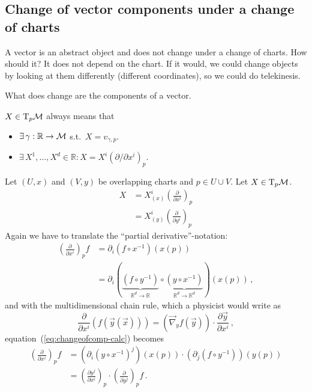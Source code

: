 \documentclass[11pt, a4paper, twocolumn]{article} %
\begin{document}
\subsection{Change of vector components under a change of charts}
\begin{note}
    A vector is an abstract object and does not change under a change of charts.
    How should it? It does not depend on the chart.
    If it would, we could change objects by looking at them differently (different coordinates),
    so we could do telekinesis.

    What does change are the components of a vector.
\end{note}
\begin{terminology}
    $X\in \T_p\M$ always means that 
    \begin{itemize}
        \item $\exists\,\gamma:\mathbb{R}\to\mathcal{M}$ s.t.\ $X = v_{\gamma,p}$.
        \item $\exists\, X^1,\ldots,X^d \in \mathbb{R}: X = X^i\left( \partial/\partial x^i \right)_p$.
    \end{itemize}
\end{terminology}
Let $(U, x)$ and $(V,y)$ be overlapping charts and $p\in U\cup V$.
Let $X \in \T_p\M$.
\begin{align}
    X &= X_{(x)}^i\left( \frac{\partial}{\partial x^i} \right)_p\nonumber\\
    &= X_{(y)}^i\left( \frac{\partial}{\partial y^i} \right)_p
    \label{eq:vectransformdef}
\end{align}
Again we have to translate the ``partial derivative''-notation:
\begin{align}
    \left( \frac{\partial}{\partial x^i} \right)_p f &= 
    \partial_i \left( f\circ x^{-1} \right)(x(p))\label{eq:changeofcomp-calc}\\
    &= \partial_i \left( \underbrace{(f\circ y^{-1})}_{\mathbb{R}^d\to\mathbb{R}}
    \circ \underbrace{(y\circ x^{-1})}_{\mathbb{R}^d\to\mathbb{R}^d}
    \right)(x(p))\nonumber\,,
\end{align}
and with the multidimensional chain rule, which a physicist would write as
\begin{equation}
    \frac{\partial}{\partial x^i}\left( f(\vec{y}(\vec{x})) \right) = 
    \left( \vec{\nabla}_y f(\vec{y}) \right)\cdot \frac{\partial \vec{y}}{\partial x^i}\,,
\end{equation}
equation~(\ref{eq:changeofcomp-calc}) becomes
\begin{align}
    \left( \frac{\partial}{\partial x^i} \right)_p f &= 
    \left( \partial_i (y\circ x^{-1} )^{j}\right)(x(p))\cdot
    \left( \partial_j(f\circ y^{-1}) \right)(y(p))\nonumber\\
            &= \left(\frac{\partial y^j}{\partial x^i}\right)_p \cdot \left(\frac{\partial}{\partial y^j}\right)_p f\,.
\end{align}
\end{document}
